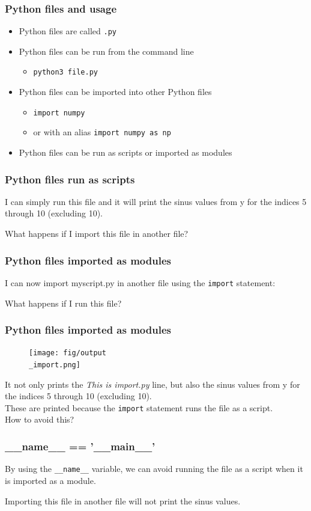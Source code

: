 \documentclass{beamer}
\begin{document}
\begin{frame}
\frametitle{Python files and usage}
  \begin{itemize}
    \item Python files are called \texttt{.py}
    \item Python files can be run from the command line
    \begin{itemize}
      \item \texttt{python3 file.py}
    \end{itemize} 
    \item Python files can be imported into other Python files
    \begin{itemize}
      \item \texttt{import numpy}
      \item or with an alias \texttt{import numpy as np}
    \end{itemize}
    \item Python files can be run as scripts or imported as modules
  \end{itemize}
\end{frame}
\begin{frame}
  \frametitle{Python files run as scripts}
  I can simply run this file and it will print the sinus values from y for the indices 5 through 10 (excluding 10).
  
  What happens if I import this file in another file?
\end{frame}
\begin{frame}
  \frametitle{Python files imported as modules}
  I can now import myscript.py in another file using the \texttt{import} statement:
  
  \vspace{5mm}
  What happens if I run this file?
\end{frame}
\begin{frame}
  \frametitle{Python files imported as modules}
  \begin{figure}[H]
    \texttt{[image: fig/output\\\_import.png]}
  \end{figure}
  It not only prints the \textit{This is import.py} line, but also the sinus values from y for the indices 5 through 10 (excluding 10).\\
  These are printed because the \texttt{import} statement runs the file as a script.\\
  How to avoid this?
\end{frame}
\begin{frame}
  \frametitle{\_\_name\_\_ == '\_\_main\_\_'}
  By using the \texttt{\_\_name\_\_} variable, we can avoid running the file as a script when it is imported as a module.\\
  \vspace{5mm}
  
  Importing this file in another file will not print the sinus values.
\end{frame}
\end{document}
